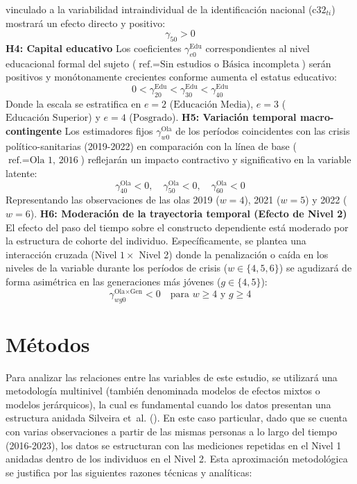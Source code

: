 \documentclass[
  spanish,
  a4paper,
  oneside]{scrbook}
\begin{document}
vinculado a la variabilidad intraindividual de la identificación
nacional (\(\text{c32}_{ti}\)) mostrará un efecto directo y positivo:
\[\gamma_{50} > 0\] \textbf{H4: Capital educativo} Los coeficientes
\(\gamma^{\text{Edu}}_{e0}\) correspondientes al nivel educacional
formal del sujeto
(\(\text{ref.} = \text{Sin estudios o Básica incompleta}\)) serán
positivos y monótonamente crecientes conforme aumenta el estatus
educativo:
\[0 < \gamma^{\text{Edu}}_{20} < \gamma^{\text{Edu}}_{30} < \gamma^{\text{Edu}}_{40}\]
Donde la escala se estratifica en \(e=2\) (\(\text{Educación Media}\)),
\(e=3\) (\(\text{Educación Superior}\)) y \(e=4\) (\(\text{Posgrado}\)).
\textbf{H5: Variación temporal macro-contingente} Los estimadores fijos
\(\gamma^{\text{Ola}}_{w0}\) de los períodos coincidentes con las crisis
político-sanitarias (2019-2022) en comparación con la línea de base
(\(\text{ref.} = \text{Ola 1, 2016}\)) reflejarán un impacto contractivo
y significativo en la variable latente:
\[\gamma^{\text{Ola}}_{40} < 0, \quad \gamma^{\text{Ola}}_{50} < 0, \quad \gamma^{\text{Ola}}_{60} < 0\]
Representando las observaciones de las olas 2019 (\(w=4\)), 2021
(\(w=5\)) y 2022 (\(w=6\)). \textbf{H6: Moderación de la trayectoria
temporal (Efecto de Nivel 2)} El efecto del paso del tiempo sobre el
constructo dependiente está moderado por la estructura de cohorte del
individuo. Específicamente, se plantea una interacción cruzada (Nivel
\(1 \times\) Nivel 2) donde la penalización o caída en los niveles de la
variable durante los períodos de crisis (\(w \in \{4, 5, 6\}\)) se
agudizará de forma asimétrica en las generaciones más jóvenes
(\(g \in \{4, 5\}\)):
\[\gamma^{\text{Ola}\times\text{Gen}}_{wg0} < 0 \quad \text{para } w \geq 4 \text{ y } g \geq 4\]


\chapter{Métodos}\label{muxe9todos}

Para analizar las relaciones entre las variables de este estudio, se
utilizará una metodología multinivel (también denominada modelos de
efectos mixtos o modelos jerárquicos), la cual es fundamental cuando los
datos presentan una estructura anidada Silveira et~al.
(). En este caso
particular, dado que se cuenta con varias observaciones a partir de las
mismas personas a lo largo del tiempo (2016-2023), los datos se
estructuran con las mediciones repetidas en el Nivel 1 anidadas dentro
de los individuos en el Nivel 2. Esta aproximación metodológica se
justifica por las siguientes razones técnicas y analíticas:
\end{document}
